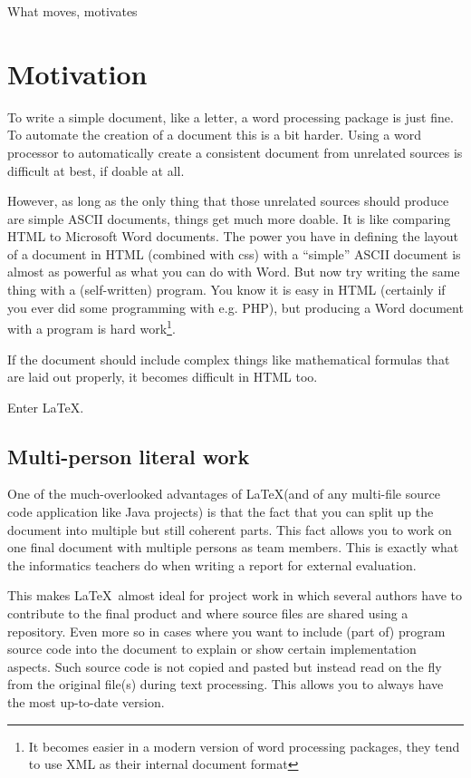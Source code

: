 \def\TheFile{ch02_motivates.tex}

\begin{savequote}[15cm]
  \vspace{-30mm}
  \raggedleft
  \sffamily
  What moves, motivates
\end{savequote}
\chapter{Motivation}
To write a simple document, like a letter, a word processing package 
is just fine.
To automate the creation of a document this is a bit harder. 
Using a word processor to automatically create a consistent document from 
unrelated sources is difficult at best, if doable at all.

However, as long as the only thing that those unrelated sources should
produce are simple ASCII documents, things get much more
doable. It is like comparing HTML to Microsoft Word documents. The power
you have in defining the layout of a document in HTML (combined with
css) with a ``simple'' ASCII document is almost as powerful as what you
can do with Word. But now try writing the same thing with a (self-written) program. You know it is easy in HTML (certainly if you ever
did some programming with e.g. PHP), but producing a Word document with
a program is hard work\footnote{It becomes easier in a modern version of
word processing packages, they tend to use XML as their internal document format}. 

If the document should include complex things like mathematical
formulas that are laid out properly, it becomes difficult in HTML too.

Enter \LaTeX.

\section{Multi-person literal work}
One of the much-overlooked advantages of \LaTeX (and of any multi-file
source code application like Java projects) is that the fact that you
can split up the document into multiple but still coherent parts.
This fact allows you to work on one final document with multiple
persons as team members. This is exactly what the informatics teachers do when writing a report for external evaluation.

This makes \LaTeX\ almost ideal for project work in which several
authors have to contribute to the final product and where source files
are shared using a repository. Even more so in
cases where you want to include (part of) program source code
into the document to explain or show certain implementation
aspects. Such source code is not copied and pasted but instead read
on the fly from the original file(s) during text processing. This
allows you to always have the most up-to-date version.

